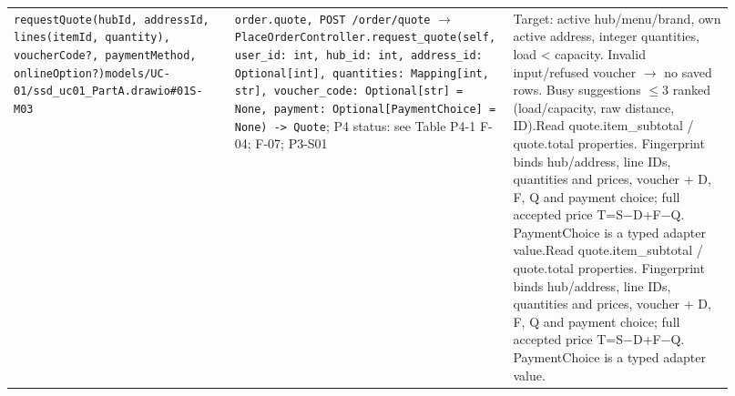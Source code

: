 \begin{longtable}{>{\raggedright\arraybackslash}p{0.3067\linewidth}>{\raggedright\arraybackslash}p{0.3067\linewidth}>{\raggedright\arraybackslash}p{0.3067\linewidth}}
\texttt{requestQuote(hubId, addressId, lines(itemId, quantity), voucherCode?, paymentMethod, onlineOption?)}\newline{}\texttt{models/\allowbreak{}UC-01/\allowbreak{}ssd\_\allowbreak{}uc01\_\allowbreak{}PartA.\allowbreak{}drawio\#01S-M03} & \texttt{order.\allowbreak{}quote, POST /\allowbreak{}order/\allowbreak{}quote} \ensuremath{\rightarrow} \texttt{PlaceOrderController.\allowbreak{}request\_\allowbreak{}quote(self, user\_\allowbreak{}id: int, hub\_\allowbreak{}id: int, address\_\allowbreak{}id: Optional[int], quantities: Mapping[int, str], voucher\_\allowbreak{}code: Optional[str] = None, payment: Optional[PaymentChoice] = None) -\textgreater{} Quote}; P4 status: see Table P4-1 F-04; F-07; P3-S01 & Target: active hub/menu/brand, own active address, integer quantities, load \textless{} capacity. Invalid input/refused voucher \ensuremath{\rightarrow} no saved rows. Busy suggestions \ensuremath{\leq}3 ranked (load/capacity, raw distance, ID).\newline{}Read quote.item\_subtotal / quote.total properties. Fingerprint binds hub/address, line IDs, quantities and prices, voucher + D, F, Q and payment choice; full accepted price T=S\ensuremath{-}D+F\ensuremath{-}Q. PaymentChoice is a typed adapter value.\newline{}Read quote.item\_subtotal / quote.total properties. Fingerprint binds hub/address, line IDs, quantities and prices, voucher + D, F, Q and payment choice; full accepted price T=S\ensuremath{-}D+F\ensuremath{-}Q. PaymentChoice is a typed adapter value. \\

\end{longtable}
